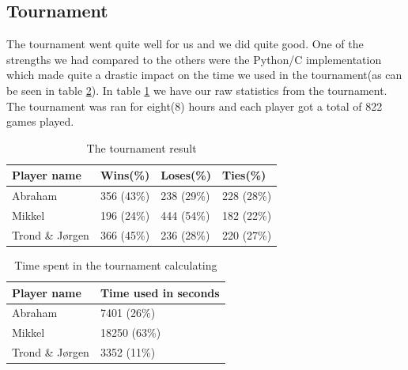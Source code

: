 \subsection{Tournament}\label{results:tournament}
The tournament went quite well for us and we did quite good. One of the strengths
we had compared to the others were the Python/C implementation which made quite
a drastic impact on the time we used in the tournament(as can be seen in table 
\ref{table:tournament time}). In table \ref{table:tournament result} we have 
our raw statistics from the tournament. The tournament was ran for
eight(8) hours and each player got a total of 822 games played.

\begin{table}[btp]
	\centering
	\begin{tabular}{| l | l | l | l |}
		\hline
		Player name & Wins(\%) & Loses(\%) & Ties(\%)\\
		\hline
		Abraham & 356 (43\%) & 238 (29\%) & 228 (28\%)\\
		Mikkel & 196 (24\%) & 444 (54\%) & 182 (22\%)\\
		Trond \& Jørgen & 366 (45\%) & 236 (28\%) & 220 (27\%)\\
		\hline
	\end{tabular}
	\caption{The tournament result}
	\label{table:tournament result}
\end{table}

\begin{table}[btp]
	\centering
	\begin{tabular}{| l | l |}
		\hline
		Player name & Time used in seconds\\
		\hline
		Abraham & 7401 (26\%) \\
		Mikkel & 18250 (63\%) \\
		Trond \& Jørgen & 3352 (11\%) \\
		\hline
	\end{tabular}
	\caption{Time spent in the tournament calculating}
	\label{table:tournament time}
\end{table}
